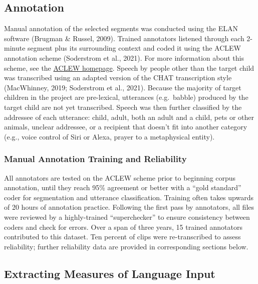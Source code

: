 \documentclass[
  man,floatsintext]{apa6}
\begin{document}
\hypertarget{annotation}{%
\subsection{Annotation}\label{annotation}}

Manual annotation of the selected segments was conducted using the ELAN software (Brugman \& Russel, 2009). Trained annotators listened through each 2-minute segment plus its surrounding context and coded it using the ACLEW annotation scheme (Soderstrom et al., 2021). For more information about this scheme, see the \href{https://sites.google.com/view/aclewdid/home}{ACLEW homepage}. Speech by people other than the target child was transcribed using an adapted version of the CHAT transcription style (MacWhinney, 2019; Soderstrom et al., 2021). Because the majority of target children in the project are pre-lexical, utterances (e.g.~babble) produced by the target child are not yet transcribed. Speech was then further classified by the addressee of each utterance: child, adult, both an adult and a child, pets or other animals, unclear addressee, or a recipient that doesn't fit into another category (e.g., voice control of Siri or Alexa, prayer to a metaphysical entity).

\hypertarget{manual-annotation-training-and-reliability}{%
\subsubsection{Manual Annotation Training and Reliability}\label{manual-annotation-training-and-reliability}}

All annotators are tested on the ACLEW scheme prior to beginning corpus annotation, until they reach 95\% agreement or better with a ``gold standard'' coder for segmentation and utterance classification. Training often takes upwards of 20 hours of annotation practice. Following the first pass by annotators, all files were reviewed by a highly-trained ``superchecker'' to ensure consistency between coders and check for errors. Over a span of three years, 15 trained annotators contributed to this dataset. Ten percent of clips were re-transcribed to assess reliability; further reliability data are provided in corresponding sections below.

\hypertarget{extracting-measures-of-language-input}{%
\subsection{Extracting Measures of Language Input}\label{extracting-measures-of-language-input}}
\end{document}
